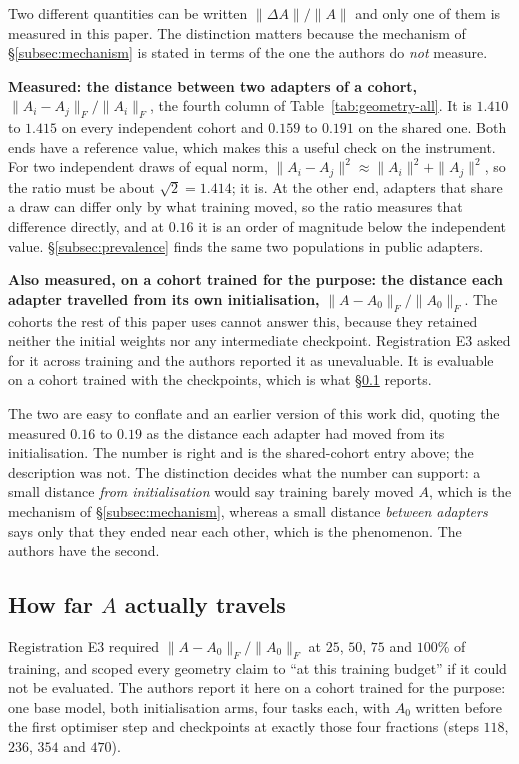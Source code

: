 Two different quantities can be written $\|\Delta A\|/\|A\|$ and only one of
them is measured in this paper. The distinction matters because the
mechanism of \S\ref{subsec:mechanism} is stated in terms of the one the authors do
\emph{not} measure.

\textbf{Measured: the distance between two adapters of a cohort,}
$\|A_i - A_j\|_F/\|A_i\|_F$, the fourth column of
Table~\ref{tab:geometry-all}. It is $1.410$ to $1.415$ on every independent
cohort and $0.159$ to $0.191$ on the shared one. Both ends have a reference
value, which makes this a useful check on the instrument. For two
independent draws of equal norm, $\|A_i - A_j\|^2 \approx \|A_i\|^2 +
\|A_j\|^2$, so the ratio must be about $\sqrt 2 = 1.414$; it is. At the
other end, adapters that share a draw can differ only by what training
moved, so the ratio measures that difference directly, and at $0.16$ it is
an order of magnitude below the independent value.
\S\ref{subsec:prevalence} finds the same two populations in public adapters.

\textbf{Also measured, on a cohort trained for the purpose: the distance each
adapter travelled from its own initialisation,} $\|A - A_0\|_F/\|A_0\|_F$. The
cohorts the rest of this paper uses cannot answer this, because they retained
neither the initial weights nor any intermediate checkpoint. Registration E3
asked for it across training and the authors reported it as unevaluable. It is
evaluable on a cohort trained with the checkpoints, which is what
\S\ref{subsec:drift-result} reports.

The two are easy to conflate and an earlier version of this work did,
quoting the measured $0.16$ to $0.19$ as the distance each adapter had moved
from its initialisation. The number is right and is the shared-cohort entry
above; the description was not. The distinction decides what the number can
support: a small distance \emph{from initialisation} would say training barely
moved $A$, which is the mechanism of \S\ref{subsec:mechanism}, whereas a small
distance \emph{between adapters} says only that they ended near each other,
which is the phenomenon. The authors have the second.

\subsection{How far \texorpdfstring{$A$}{A} actually travels}
\label{subsec:drift-result}

Registration E3 required $\|A - A_0\|_F/\|A_0\|_F$ at $25$, $50$, $75$ and
$100\%$ of training, and scoped every geometry claim to ``at this training
budget'' if it could not be evaluated. The authors report it here on a cohort trained
for the purpose: one base model, both initialisation arms, four tasks each,
with $A_0$ written before the first optimiser step and checkpoints at exactly
those four fractions (steps $118$, $236$, $354$ and $470$).

